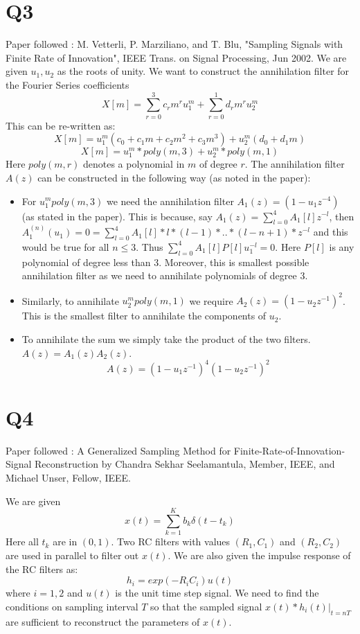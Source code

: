 \documentclass{article}
\begin{document}
\section*{Q3}
Paper followed : M. Vetterli, P. Marziliano, and T. Blu, "Sampling Signals with Finite Rate of Innovation", IEEE Trans. on Signal Processing, Jun 2002.
We are given $u_1, u_2$ as the roots of unity. We want to construct the annihilation filter for the Fourier Series coefficients $$X[m] = \sum_{r=0}^3 c_r m^r u_1^m + \sum_{r=0}^1 d_r m^r u_2^m$$
This can be re-written as:
$$X[m] = u_1^m (c_0 + c_1 m + c_2 m^2 + c_3 m^3) + u_2^m (d_0 + d_1 m)$$
$$X[m] = u_1^m * poly(m, 3) + u_2^m * poly(m, 1)$$
Here $poly(m, r)$ denotes a polynomial in $m$ of degree $r$.
The annihilation filter $A(z)$ can be constructed in the following way (as noted in the paper):
\begin{itemize}
\item For $u_1^m poly(m, 3)$ we need the annihilation filter $A_1(z) = (1 - u_1z^{-4})$ (as stated in the paper). This is because, say $A_1(z) = \sum_{l=0}^4A_1[l]z^{-l}$, then $A_1^{(n)}(u_1) = 0 = \sum_{l=0}^4A_1[l] * l * (l-1) * .. * (l - n + 1) * z^{-l}$ and this would be true for all $n \le 3$. Thus $\sum_{l=0}^4A_1[l]P[l]u_1^{-l} = 0$. Here $P[l]$ is any polynomial of degree less than $3$. Moreover, this is smallest possible annihilation filter as we need to annihilate polynomials of degree 3.
\item Similarly, to annihilate $u_2^m poly(m, 1)$ we require $A_2(z) = (1 - u_2z^{-1})^2$. This is the smallest filter to annihilate the components of $u_2$.
\item To annihilate the sum we simply take the product of the two filters. $A(z) = A_1(z) A_2(z)$.
  $$A(z) = (1 - u_1z^{-1})^4 (1 - u_2z^{-1})^2$$
\end{itemize}

\section*{Q4}
Paper followed : A Generalized Sampling Method for Finite-Rate-of-Innovation-Signal Reconstruction by Chandra Sekhar Seelamantula, Member, IEEE, and Michael Unser, Fellow, IEEE.

We are given
$$x(t) = \sum_{k=1}^K b_k \delta (t - t_k)$$
Here all $t_k$ are in $(0, 1)$. Two RC filters with values $(R_1,C_1)$ and $(R_2, C_2)$ are used in parallel to filter out $x(t)$. We are also given the impulse response of the RC filters as:
$$h_i = exp(-R_i C_i) u(t)$$
where $i = 1, 2$ and $u(t)$ is the unit time step signal. We need to find the conditions on sampling interval $T$ so that the sampled signal $x(t) * h_i(t)|_{t = nT}$ are sufficient to reconstruct the parameters of $x(t)$.
\end{document}
